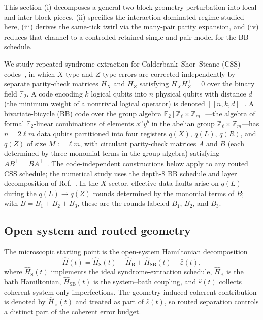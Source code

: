 \documentclass[
aps,
prx,
10pt,
twocolumn,
groupedaddress,
longbibliography,
nofootinbib,
floatfix
]{revtex4-2}
\theoremstyle{definition}
\newcommand{\F}{\mathbb{F}_2}
\newcommand{\bb}[1]{\ensuremath{\left[\!\left[#1\right]\!\right]}}
\newcommand{\Hx}{\hat H_{\times}}
\begin{document}
This section (i) decomposes a general two-block geometry perturbation into local and inter-block pieces, (ii) specifies the interaction-dominated regime studied here, (iii) derives the same-tick twirl via the many-pair parity expansion, and (iv) reduces that channel to a controlled retained single-and-pair model for the BB schedule.

We study repeated syndrome extraction for Calderbank--Shor--Steane (CSS) codes~\cite{calderbank_shor_1996,steane_1996}, in which $X$-type and $Z$-type errors are corrected independently by separate parity-check matrices $H_X$ and $H_Z$ satisfying $H_X H_Z^\top=0$ over the binary field $\F$. A code encoding $k$ logical qubits into $n$ physical qubits with distance $d$ (the minimum weight of a nontrivial logical operator) is denoted $\bb{n,k,d}$. A bivariate-bicycle (BB) code over the group algebra $\F[\mathbb{Z}_\ell\times\mathbb{Z}_m]$---the algebra of formal $\F$-linear combinations of elements $x^a y^b$ in the abelian group $\mathbb{Z}_\ell\times\mathbb{Z}_m$---has $n=2\ell m$ data qubits partitioned into four registers $q(X)$, $q(L)$, $q(R)$, and $q(Z)$ of size $M:=\ell m$, with circulant parity-check matrices $A$ and $B$ (each determined by three monomial terms in the group algebra) satisfying $AB^\top=BA^\top$~\cite{bravyi_memory_2024}. The code-independent constructions below apply to any routed CSS schedule; the numerical study uses the depth-$8$ BB schedule and layer decomposition of Ref.~. In the $X$ sector, effective data faults arise on $q(L)$ during the $q(L)\to q(Z)$ rounds determined by the monomial terms of $B$; with $B=B_1+B_2+B_3$, these are the rounds labeled $B_1$, $B_2$, and $B_3$.

\subsection{Open system and routed geometry}

The microscopic starting point is the open-system Hamiltonian decomposition
\begin{equation}
\hat H(t)=\hat H_{\mathrm S}(t)+\hat H_{\mathrm B}+\hat H_{\mathrm{SB}}(t)+\hat\varepsilon(t),
\label{eq:open-system-main}
\end{equation}
where $\hat H_{\mathrm S}(t)$ implements the ideal syndrome-extraction schedule, $\hat H_{\mathrm B}$ is the bath Hamiltonian, $\hat H_{\mathrm{SB}}(t)$ is the system–bath coupling, and $\hat\varepsilon(t)$ collects coherent system-only imperfections. The geometry-induced coherent contribution is denoted by $\Hx(t)$ and treated as part of $\hat\varepsilon(t)$, so routed separation controls a distinct part of the coherent error budget.
\end{document}
